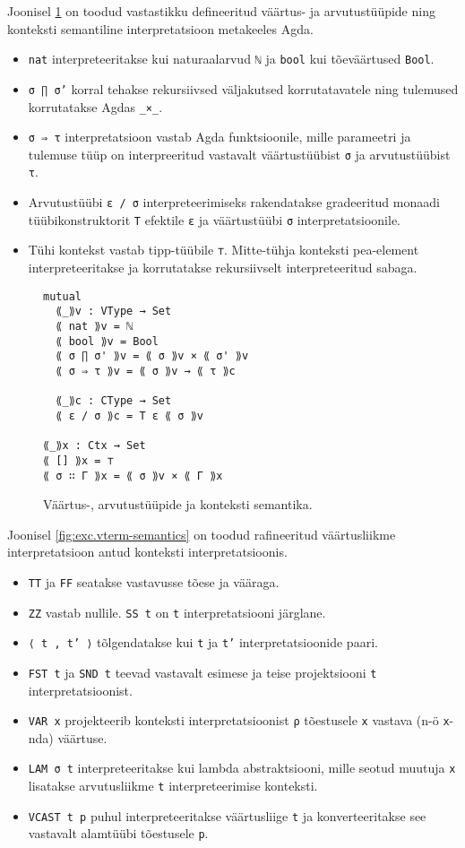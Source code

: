 \documentclass[a4paper,12pt]{article}
\begin{document}
Joonisel \ref{fig:type-semantics} on toodud vastastikku defineeritud väärtus- ja arvutustüüpide ning konteksti semantiline interpretatsioon metakeeles Agda.
\begin{itemize}
\item {\tt nat} interpreteeritakse kui naturaalarvud {\tt ℕ} ja {\tt bool} kui tõeväärtused {\tt Bool}.
\item {\tt σ ∏ σ'} korral tehakse rekursiivsed väljakutsed korrutatavatele ning tulemused korrutatakse Agdas {\tt _×_}.
\item {\tt σ ⇒ τ} interpretatsioon vastab Agda funktsioonile, mille parameetri ja tulemuse tüüp on interpreeritud vastavalt väärtustüübist {\tt σ} ja arvutustüübist {\tt τ}.
\item Arvutustüübi {\tt ε / σ} interpreteerimiseks rakendatakse gradeeritud monaadi tüübikonstruktorit {\tt T} efektile {\tt ε} ja väärtustüübi {\tt σ} interpretatsioonile.
\item Tühi kontekst vastab tipp-tüübile {\tt ⊤}. Mitte-tühja konteksti pea-element interpreteeritakse ja korrutatakse rekursiivselt interpreteeritud sabaga.
\end{itemize}

\begin{figure}
  \begin{BVerbatim}
mutual
  ⟪_⟫v : VType → Set
  ⟪ nat ⟫v = ℕ
  ⟪ bool ⟫v = Bool
  ⟪ σ ∏ σ' ⟫v = ⟪ σ ⟫v × ⟪ σ' ⟫v
  ⟪ σ ⇒ τ ⟫v = ⟪ σ ⟫v → ⟪ τ ⟫c

  ⟪_⟫c : CType → Set
  ⟪ ε / σ ⟫c = T ε ⟪ σ ⟫v

⟪_⟫x : Ctx → Set
⟪ [] ⟫x = ⊤
⟪ σ ∷ Γ ⟫x = ⟪ σ ⟫v × ⟪ Γ ⟫x
  \end{BVerbatim}
  \caption{Väärtus-, arvutustüüpide ja konteksti semantika.}
  \label{fig:type-semantics}
\end{figure}

Joonisel \ref{fig:exc.vterm-semantics} on toodud rafineeritud väärtusliikme interpretatsioon antud konteksti interpretatsioonis.
\begin{itemize}
\item {\tt TT} ja {\tt FF} seatakse vastavusse tõese ja vääraga.
\item {\tt ZZ} vastab nullile. {\tt SS t} on {\tt t} interpretatsiooni järglane.
\item {\tt ⟨ t , t' ⟩} tõlgendatakse kui {\tt t} ja {\tt t'} interpretatsioonide paari.
\item {\tt FST t} ja {\tt SND t} teevad vastavalt esimese ja teise projektsiooni {\tt t} interpretatsioonist.
\item {\tt VAR x} projekteerib konteksti interpretatsioonist {\tt ρ} tõestusele {\tt x} vastava (n-ö {\tt x}-nda) väärtuse.
\item {\tt LAM σ t} interpreteeritakse kui lambda abstraktsiooni, mille seotud muutuja {\tt x} lisatakse arvutusliikme {\tt t} interpreteerimise konteksti.
\item {\tt VCAST t p} puhul interpreteeritakse väärtusliige {\tt t} ja konverteeritakse see vastavalt alamtüübi tõestusele {\tt p}.
\end{itemize}
\end{document}
